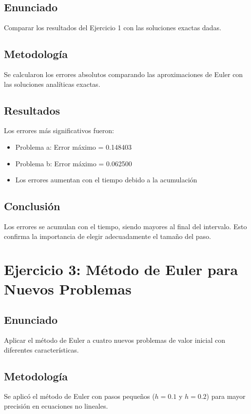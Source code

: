 \documentclass[12pt,a4paper]{article}
\begin{document}
\subsection{Enunciado}
Comparar los resultados del Ejercicio 1 con las soluciones exactas dadas.

\subsection{Metodología}
Se calcularon los errores absolutos comparando las aproximaciones de Euler con las soluciones analíticas exactas.

\subsection{Resultados}
Los errores más significativos fueron:
\begin{itemize}
    \item Problema a: Error máximo = 0.148403
    \item Problema b: Error máximo = 0.062500
    \item Los errores aumentan con el tiempo debido a la acumulación
\end{itemize}

\subsection{Conclusión}
Los errores se acumulan con el tiempo, siendo mayores al final del intervalo. Esto confirma la importancia de elegir adecuadamente el tamaño del paso.

\section{Ejercicio 3: Método de Euler para Nuevos Problemas}

\subsection{Enunciado}
Aplicar el método de Euler a cuatro nuevos problemas de valor inicial con diferentes características.

\subsection{Metodología}
Se aplicó el método de Euler con pasos pequeños ($h = 0.1$ y $h = 0.2$) para mayor precisión en ecuaciones no lineales.
\end{document}
